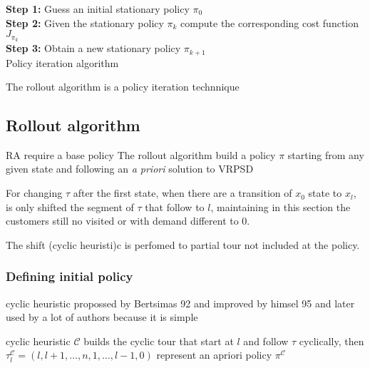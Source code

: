 \begin{algorithm}
 \textbf{Step 1:} Guess an initial stationary policy $\pi_0$\\
 \textbf{Step 2:} Given the stationary policy $\pi_k$ compute the corresponding cost function $J_{\pi_k}$\\
 \textbf{Step 3:} Obtain a new stationary policy $\pi_{k+1}$\\
 \caption{Policy iteration algorithm}\label{algo:policy_iteration_general}
\end{algorithm}

The rollout algorithm is a policy iteration technnique


\subsection{Rollout algorithm}

RA require a base policy
The rollout algorithm build a policy $\pi$ starting from any given state and following an \textit{a priori} solution to VRPSD

For changing $\tau$ after the first state, when there are a transition of $x_0$ state to $x_l$, is only shifted the segment of $\tau$ that follow to $l$, maintaining in this section the customers still no visited or with demand different to $0$.

The shift (cyclic heuristi)c is perfomed to partial tour not included at the policy.


\subsubsection{Defining initial policy}\label{sec:initial_policy}


cyclic heuristic propossed by Bertsimas 92  and improved by himsel 95 and later used by a lot of authors because it is simple 

cyclic heuristic $\mathcal{C}$ builds the cyclic tour that start at $l$ and follow $\tau$ cyclically, then $\tau^\mathcal{C}_l = (l, l+1, \ldots , n , 1 , \ldots , l-1, 0)$ represent an apriori policy $\pi^\mathcal{C}$




